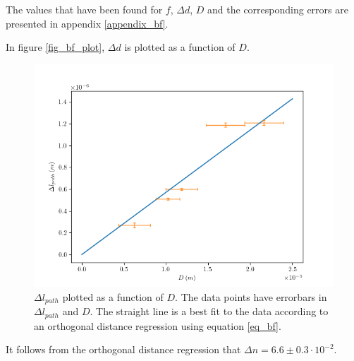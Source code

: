 The values that have been found for $f$, $\Delta d$, $D$ and the corresponding errors are presented in appendix \ref{appendix_bf}.

In figure \ref{fig_bf_plot}, $\Delta d$ is plotted as a function of $D$.

\begin{figure}[h!]
	\centering
	\includegraphics[width=18cm]{afbeeldingen/bf_plot.png}
	\caption{$\Delta l_{path}$ plotted as a function of $D$. The data points have errorbars in $\Delta l_{path}$ and $D$. The straight line is a best fit to the data according to an orthogonal distance regression using equation \ref{eq_bf}.}
\end{figure}

It follows from the orthogonal distance regression that $\Delta n = 6.6 \pm 0.3 \cdot 10^{-2}$.

\newpage

